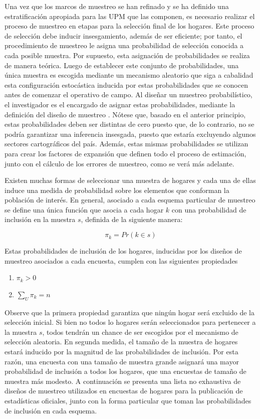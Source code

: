 \documentclass[12pt,spanish,]{book}
\providecommand{\tightlist}{%
  \setlength{\itemsep}{0pt}\setlength{\parskip}{0pt}}
\begin{document}
Una vez que los marcos de muestreo se han refinado y se ha definido una estratificación apropiada para las UPM que las componen, es necesario realizar el proceso de muestreo en etapas para la selección final de los hogares. Este proceso de selección debe inducir insesgamiento, además de ser eficiente; por tanto, el procedimiento de muestreo le asigna una probabilidad de selección conocida a cada posible muestra. Por supuesto, esta asignación de probabilidades se realiza de manera teórica. Luego de establecer este conjunto de probabilidades, una única muestra es escogida mediante un mecanismo aleatorio que siga a cabalidad esta configuración estocástica inducida por estas probabilidades que se conocen antes de comenzar el operativo de campo. Al diseñar un muestreo probabilístico, el investigador es el encargado de asignar estas probabilidades, mediante la definición del diseño de muestreo \autocite{Sarndal_Swensson_Wretman_2003}. Nótese que, basado en el anterior principio, estas probabilidades deben ser distintas de cero puesto que, de lo contrario, no se podría garantizar una inferencia insesgada, puesto que estaría excluyendo algunos sectores cartográficos del país. Además, estas mismas probabilidades se utilizan para crear los factores de expansión que definen todo el proceso de estimación, junto con el cálculo de los errores de muestreo, como se verá más adelante.

Existen muchas formas de seleccionar una muestra de hogares y cada una de ellas induce una medida de probabilidad sobre los elementos que conforman la población de interés. En general, asociado a cada esquema particular de muestreo se define una única función que asocia a cada hogar \(k\) con una probabilidad de inclusión en la muestra \(s\), definida de la siguiente manera:

\[\pi_k = Pr (k \in s)\]

Estas probabilidades de inclusión de los hogares, inducidas por los diseños de muestreo asociados a cada encuesta, cumplen con las siguientes propiedades

\begin{enumerate}
\def\labelenumi{\arabic{enumi}.}
\tightlist
\item
  \(\pi_k > 0\)
\item
  \(\sum_U \pi_k = n\)
\end{enumerate}

Observe que la primera propiedad garantiza que ningún hogar será excluido de la selección inicial. Si bien no todos lo hogares serán seleccionados para pertenecer a la muestra \(s\), todos tendrán un chance de ser escogidos por el mecanismo de selección aleatoria. En segunda medida, el tamaño de la muestra de hogares estará inducido por la magnitud de las probabilidades de inclusión. Por esta razón, una encuesta con una tamaño de muestra grande asignará una mayor probabilidad de inclusión a todos los hogares, que una encuestas de tamaño de muestra más modesto. A continuación se presenta una lista no exhaustiva de diseños de muestreo utilizados en encuestas de hogares para la publicación de estadísticas oficiales, junto con la forma particular que toman las probabilidades de inclusión en cada esquema.
\end{document}
